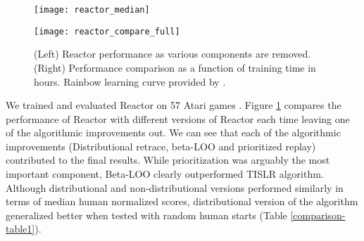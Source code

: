 \documentclass{article}
\begin{document}
\begin{figure}
\centering
\vspace{0pt}
\begin{minipage}{.48\textwidth}
  \centerline{\texttt{[image: reactor\_median]}}
\end{minipage}\vspace{0pt}
\begin{minipage}{.48\textwidth}
\vspace{0pt}
  \centering
  \texttt{[image: reactor\_compare\_full]}
\end{minipage}
  \caption{
  \small (Left) Reactor performance as various components are removed.
  (Right) Performance comparison as a function of training time in hours. Rainbow learning curve provided by \cite{rainbow}.}
  \label{learningcurves}
\end{figure}
We trained and evaluated Reactor on 57 Atari games \citep{bellemare2013arcade}. 
Figure \ref{learningcurves} compares the performance of Reactor with 
different versions of Reactor each time leaving one of the algorithmic 
improvements out. We can see that each of the algorithmic improvements 
(Distributional retrace, beta-LOO and prioritized replay) 
contributed to the final results. While prioritization was arguably the 
most important component, Beta-LOO clearly
outperformed TISLR algorithm. Although distributional and non-distributional 
versions performed similarly in terms of median human normalized scores, 
distributional version of the 
algorithm generalized better when tested with random human starts (Table 
\ref{comparison-table1}).
\end{document}
